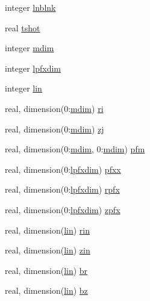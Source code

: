 \begin{CompactItemize}
integer \hyperlink{namespaceshotfile2dg_8d49fa9517af47ec3a8cb815e2484ab3}{lnblnk}
\item 
real \hyperlink{namespaceshotfile2dg_c8db051db6516dbce57bfcf43cebcd46}{tshot}
\item 
integer \hyperlink{namespaceshotfile2dg_d5647f654b30284142951c13b5f6fa46}{mdim}
\item 
integer \hyperlink{namespaceshotfile2dg_d8ec7f26f5f68dace4655cd811c755a1}{lpfxdim}
\item 
integer \hyperlink{namespaceshotfile2dg_dcd8847b41f8af202e2dac58135c0113}{lin}
\item 
real, dimension(0:\hyperlink{namespaceshotfile2dg_d5647f654b30284142951c13b5f6fa46}{mdim}) \hyperlink{namespaceshotfile2dg_4b7dcff54fb43627b08f2afdb56abffd}{ri}
\item 
real, dimension(0:\hyperlink{namespaceshotfile2dg_d5647f654b30284142951c13b5f6fa46}{mdim}) \hyperlink{namespaceshotfile2dg_99af9f1faabd9d89aecaf6bbb80e91ba}{zj}
\item 
real, dimension(0:\hyperlink{namespaceshotfile2dg_d5647f654b30284142951c13b5f6fa46}{mdim}, 0:\hyperlink{namespaceshotfile2dg_d5647f654b30284142951c13b5f6fa46}{mdim}) \hyperlink{namespaceshotfile2dg_b2c08adaa9f0f8970d344c63abbf3790}{pfm}
\item 
real, dimension(0:\hyperlink{namespaceshotfile2dg_d8ec7f26f5f68dace4655cd811c755a1}{lpfxdim}) \hyperlink{namespaceshotfile2dg_331286c491d6a04e169e34eb2773ebfb}{pfxx}
\item 
real, dimension(0:\hyperlink{namespaceshotfile2dg_d8ec7f26f5f68dace4655cd811c755a1}{lpfxdim}) \hyperlink{namespaceshotfile2dg_462227f73e64d9a3ce1b6889907e3ac6}{rpfx}
\item 
real, dimension(0:\hyperlink{namespaceshotfile2dg_d8ec7f26f5f68dace4655cd811c755a1}{lpfxdim}) \hyperlink{namespaceshotfile2dg_9768ea742d6b7efdfd6e610f1e6f8914}{zpfx}
\item 
real, dimension(\hyperlink{namespaceshotfile2dg_dcd8847b41f8af202e2dac58135c0113}{lin}) \hyperlink{namespaceshotfile2dg_4c40d0bff2a50d6b8c210cb73852a429}{rin}
\item 
real, dimension(\hyperlink{namespaceshotfile2dg_dcd8847b41f8af202e2dac58135c0113}{lin}) \hyperlink{namespaceshotfile2dg_16cc50d1548b7d0f10879cf3fdc226c6}{zin}
\item 
real, dimension(\hyperlink{namespaceshotfile2dg_dcd8847b41f8af202e2dac58135c0113}{lin}) \hyperlink{namespaceshotfile2dg_aab63facede49889cb1dd91c24755639}{br}
\item 
real, dimension(\hyperlink{namespaceshotfile2dg_dcd8847b41f8af202e2dac58135c0113}{lin}) \hyperlink{namespaceshotfile2dg_bbe37b790a236f45707d1c9682d0c2d1}{bz}

\end{CompactItemize}
